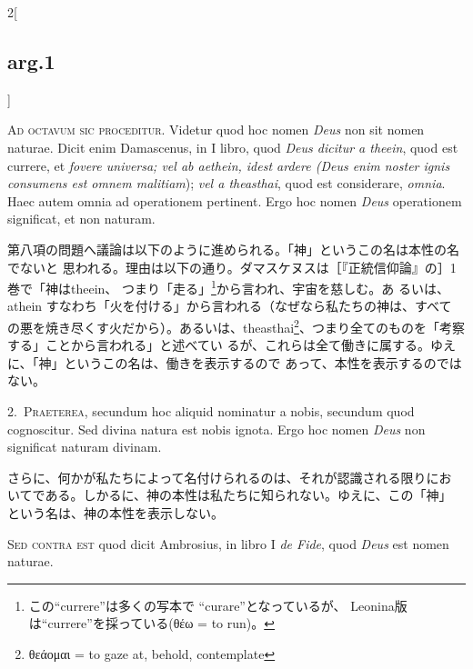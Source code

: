 \documentclass[paper=a4paper,fontsize=10pt,jafontsize=9pt,titlepage]{jlreq}
\begin{document}
\begin{paracol}{2}[\subsection{arg.1}]

{\huge A}{\scshape d octavum sic proceditur}. Videtur quod hoc nomen
{\itshape Deus} non sit nomen naturae. Dicit enim Damascenus, in I
libro, quod {\itshape Deus dicitur a theein}, quod est currere, et
{\itshape fovere universa; vel ab aethein, idest ardere (Deus enim
noster ignis consumens est omnem malitiam}); {\itshape vel a
theasthai}, quod est considerare, {\itshape omnia}. Haec autem omnia
ad operationem pertinent. Ergo hoc nomen {\itshape Deus} operationem
significat, et non naturam.

\switchcolumn

第八項の問題へ議論は以下のように進められる。「神」というこの名は本性の名でないと
思われる。理由は以下の通り。ダマスケヌスは［『正統信仰論』の］1巻で「神はtheein、
つまり「走る」\footnote{この``currere''は多くの写本で ``curare''となっているが、
Leonina版は``currere''を採っている(θέω = to run)。}から言われ、宇宙を慈しむ。あ
るいは、athein すなわち「火を付ける」から言われる（なぜなら私たちの神は、すべて
の悪を焼き尽くす火だから）。あるいは、theasthai\footnote{θεάομαι = to gaze at,
behold, contemplate}、つまり全てのものを「考察する」ことから言われる」と述べてい
るが、これらは全て働きに属する。ゆえに、「神」というこの名は、働きを表示するので
あって、本性を表示するのではない。


2.~{\scshape Praeterea}, secundum hoc aliquid nominatur a nobis,
secundum quod cognoscitur. Sed divina natura est nobis ignota. Ergo
hoc nomen {\itshape Deus} non significat naturam divinam.

\switchcolumn

さらに、何かが私たちによって名付けられるのは、それが認識される限りにお
いてである。しかるに、神の本性は私たちに知られない。ゆえに、この「神」
という名は、神の本性を表示しない。

\switchcolumn*[\subsection{s.c.}]

{\scshape Sed contra est} quod dicit Ambrosius, in libro I {\itshape
de Fide}, quod {\itshape Deus} est nomen naturae.


\end{paracol}
\end{document}
